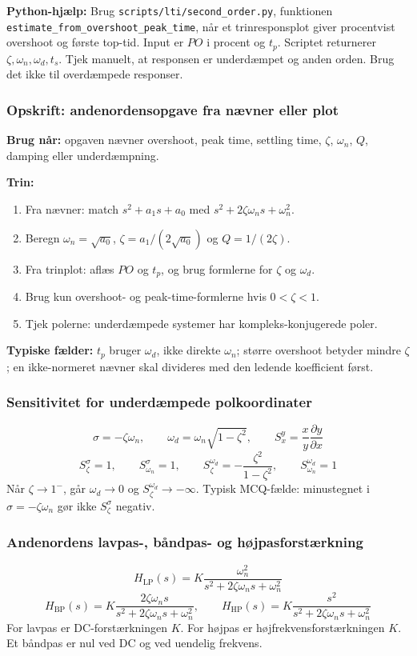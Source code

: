 \textbf{Python-hjælp:} Brug \texttt{scripts/lti/second\_order.py}, funktionen \texttt{estimate\_from\_overshoot\_peak\_time}, når et trinresponsplot giver procentvist overshoot og første top-tid. Input er \(PO\) i procent og \(t_p\). Scriptet returnerer \(\zeta,\omega_n,\omega_d,t_s\). Tjek manuelt, at responsen er underdæmpet og anden orden. Brug det ikke til overdæmpede responser.

\subsubsection{Opskrift: andenordensopgave fra nævner eller plot}
\textbf{Brug når:} opgaven nævner overshoot, peak time, settling time, \(\zeta\), \(\omega_n\), \(Q\), damping eller underdæmpning.

\textbf{Trin:}
\begin{enumerate}
    \item Fra nævner: match \(s^2+a_1s+a_0\) med \(s^2+2\zeta\omega_ns+\omega_n^2\).
    \item Beregn \(\omega_n=\sqrt{a_0}\), \(\zeta=a_1/(2\sqrt{a_0})\) og \(Q=1/(2\zeta)\).
    \item Fra trinplot: aflæs \(PO\) og \(t_p\), og brug formlerne for \(\zeta\) og \(\omega_d\).
    \item Brug kun overshoot- og peak-time-formlerne hvis \(0<\zeta<1\).
    \item Tjek polerne: underdæmpede systemer har kompleks-konjugerede poler.
\end{enumerate}

\textbf{Typiske fælder:} \(t_p\) bruger \(\omega_d\), ikke direkte \(\omega_n\); større overshoot betyder mindre \(\zeta\); en ikke-normeret nævner skal divideres med den ledende koefficient først.

\subsubsection{Sensitivitet for underdæmpede polkoordinater}
\[
\sigma=-\zeta\omega_n,\qquad \omega_d=\omega_n\sqrt{1-\zeta^2},\qquad
S_x^y=\frac{x}{y}\frac{\partial y}{\partial x}
\]
\[
S_{\zeta}^{\sigma}=1,\qquad S_{\omega_n}^{\sigma}=1,\qquad
S_{\zeta}^{\omega_d}=-\frac{\zeta^2}{1-\zeta^2},\qquad
S_{\omega_n}^{\omega_d}=1
\]
Når \(\zeta\to1^-\), går \(\omega_d\to0\) og \(S_{\zeta}^{\omega_d}\to-\infty\). Typisk MCQ-fælde: minustegnet i \(\sigma=-\zeta\omega_n\) gør ikke \(S_{\zeta}^{\sigma}\) negativ.

\subsubsection{Andenordens lavpas-, båndpas- og højpasforstærkning}
\[
H_{\mathrm{LP}}(s)=K\frac{\omega_n^2}{s^2+2\zeta\omega_n s+\omega_n^2}
\]
\[
H_{\mathrm{BP}}(s)=K\frac{2\zeta\omega_n s}{s^2+2\zeta\omega_n s+\omega_n^2},\qquad
H_{\mathrm{HP}}(s)=K\frac{s^2}{s^2+2\zeta\omega_n s+\omega_n^2}
\]
For lavpas er DC-forstærkningen \(K\). For højpas er højfrekvensforstærkningen \(K\). Et båndpas er nul ved DC og ved uendelig frekvens.
